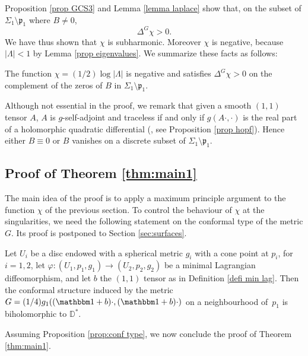 Proposition \ref{prop GCS3} and Lemma \ref{lemma laplace} show that, on the subset of $\Sigma_1\setminus\mathfrak p_1$ where $B\neq 0$,
\[
\Delta^G\chi> 0.
\]
We have thus shown that $\chi$ is subharmonic. Moreover $\chi$ is negative, because $|\Lambda|<1$ by Lemma \ref{prop eigenvalues}. We summarize these facts as follows:

\begin{cor}\label{cor subharmonic}
The function $\chi=(1/2)\log|\Lambda|$ is negative and satisfies $\Delta^G\chi>0$ on the complement of the zeros of $B$ in $\Sigma_1\setminus\mathfrak p_1$.
\end{cor}

\begin{remark}
Although not essential in the proof, we remark that given a smooth $(1,1)$ tensor $A$, $A$ is $g$-self-adjoint and traceless if and only if $g(A\cdot,\cdot)$ is the real part of a holomorphic quadratic differential (\cite{zbMATH03064601}, see Proposition \ref{prop hopf}). Hence either $B\equiv 0$ or $B$ vanishes on a discrete subset of $\Sigma_1\setminus\mathfrak p_1$.
\end{remark}

\subsection{Proof of Theorem \ref{thm:main1}}

The main idea of the proof is to apply a maximum principle argument to the function $\chi$ of the previous section. To control the behaviour of $\chi$ at the singularities, we need the following statement on the conformal type of the metric $G$. Its proof is postponed to Section \ref{sec:surfaces}.

\begin{prop}\label{prop:conf type}\label{lemma realize min lag}
Let $U_i$ be a disc endowed with a spherical metric $g_i$ with a cone point at $p_i$, for $i=1,2$, let $\varphi:(U_1,p_1,g_1)\to (U_2,p_2,g_2)$ be a minimal Lagrangian diffeomorphism, and let $b$ the $(1,1)$ tensor as in Definition \ref{defi min lag}.
Then the conformal structure induced by the metric $G=(1/4)g_1((\mathbbm 1+b)\cdot,(\mathbbm 1+b)\cdot)$ on a neighbourhood of~$p_1$ is biholomorphic to $\mathbb D^*$.
\end{prop}

Assuming Proposition \ref{prop:conf type}, we now conclude the proof of Theorem \ref{thm:main1}.

